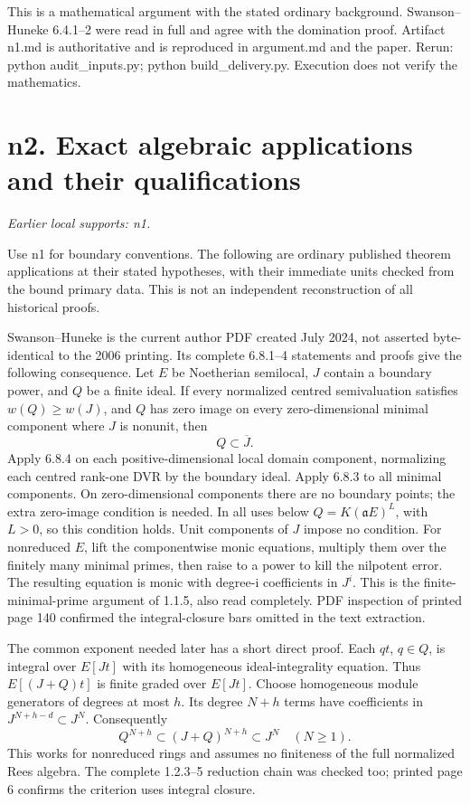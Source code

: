 \documentclass[11pt]{article}
\begin{document}
This is a mathematical argument with the stated ordinary background. Swanson--Huneke 6.4.1--2 were read in full and agree with the domination proof. Artifact n1.md is authoritative and is reproduced in argument.md and the paper. Rerun: python audit\_inputs.py; python build\_delivery.py. Execution does not verify the mathematics.

\section{n2. Exact algebraic applications and their qualifications}
\textit{Earlier local supports: n1.}

Use n1 for boundary conventions. The following are ordinary published theorem applications at their stated hypotheses, with their immediate units checked from the bound primary data. This is not an independent reconstruction of all historical proofs.

Swanson--Huneke is the current author PDF created July 2024, not asserted byte-identical to the 2006 printing. Its complete 6.8.1--4 statements and proofs give the following consequence. Let \(E\) be Noetherian semilocal, \(J\) contain a boundary power, and \(Q\) be a finite ideal. If every normalized centred semivaluation satisfies \(w(Q)\ge w(J)\), and \(Q\) has zero image on every zero-dimensional minimal component where \(J\) is nonunit, then
\[
Q\subset\overline J.
\]
Apply 6.8.4 on each positive-dimensional local domain component, normalizing each centred rank-one DVR by the boundary ideal. Apply 6.8.3 to all minimal components. On zero-dimensional components there are no boundary points; the extra zero-image condition is needed. In all uses below \(Q=K(\mathfrak aE)^L\), with \(L>0\), so this condition holds. Unit components of \(J\) impose no condition. For nonreduced \(E\), lift the componentwise monic equations, multiply them over the finitely many minimal primes, then raise to a power to kill the nilpotent error. The resulting equation is monic with degree-i coefficients in \(J^i\). This is the finite-minimal-prime argument of 1.1.5, also read completely. PDF inspection of printed page 140 confirmed the integral-closure bars omitted in the text extraction.

The common exponent needed later has a short direct proof. Each \(qt\), \(q\in Q\), is integral over \(E[Jt]\) with its homogeneous ideal-integrality equation. Thus \(E[(J+Q)t]\) is finite graded over \(E[Jt]\). Choose homogeneous module generators of degrees at most \(h\). Its degree \(N+h\) terms have coefficients in \(J^{N+h-d}\subset J^N\). Consequently
\[
Q^{N+h}\subset (J+Q)^{N+h}\subset J^N\quad(N\ge1).
\]
This works for nonreduced rings and assumes no finiteness of the full normalized Rees algebra. The complete 1.2.3--5 reduction chain was checked too; printed page 6 confirms the criterion uses integral closure.
\end{document}
